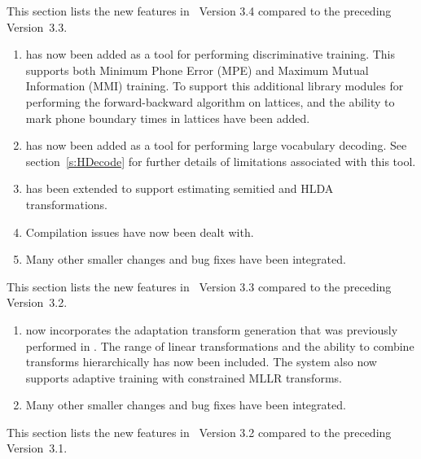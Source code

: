 
This  section lists the new
features in \HTK\ Version 3.4 compared to the preceding Version~3.3.

\begin{enumerate}
\item {} has now been added as a tool for performing
discriminative training. This supports both Minimum Phone Error (MPE)
and Maximum Mutual Information (MMI) training. To support this
additional library modules for performing the forward-backward
algorithm on lattices, and the ability to mark phone boundary
times in lattices have been added.

\item {} has now been added as a tool for performing
large vocabulary decoding. See section~\ref{s:HDecode} for
further details of limitations associated with this tool.

\item {} has been extended to support estimating 
semitied and HLDA transformations.

\item Compilation issues have now been dealt with.

\item Many other smaller changes and bug fixes have been integrated.
\end{enumerate}


This  section lists the new
features in \HTK\ Version 3.3 compared to the preceding Version~3.2.
\begin{enumerate}
\item {} now incorporates the adaptation transform
generation that was previously performed in .  The
range of linear transformations and the ability to combine transforms
hierarchically has now been included. The system also now supports 
adaptive training with constrained MLLR transforms.

\item Many other smaller changes and bug fixes have been integrated.
\end{enumerate}


This  section lists the new
features in \HTK\ Version 3.2 compared to the preceding Version~3.1.

